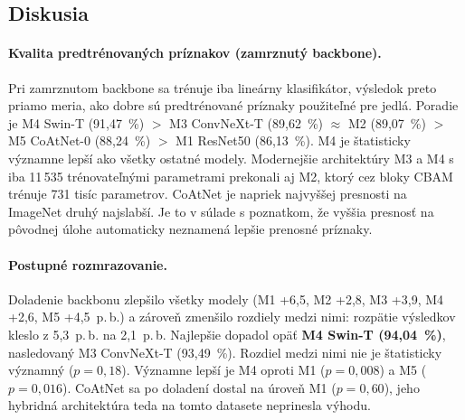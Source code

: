 
\subsection{Diskusia}

\paragraph{Kvalita predtrénovaných príznakov (zamrznutý backbone).}
Pri zamrznutom backbone sa trénuje iba lineárny klasifikátor, výsledok
preto priamo meria, ako dobre sú predtrénované príznaky použiteľné pre
jedlá. Poradie je M4 Swin-T (91,47~\%) $>$ M3 ConvNeXt-T (89,62~\%)
$\approx$ M2 (89,07~\%) $>$ M5 CoAtNet-0 (88,24~\%) $>$ M1 ResNet50
(86,13~\%). M4 je štatisticky významne lepší ako všetky ostatné modely.
Modernejšie architektúry M3 a M4 s iba 11\,535 trénovateľnými parametrami
prekonali aj M2, ktorý cez bloky CBAM trénuje 731 tisíc parametrov. CoAtNet
je napriek najvyššej presnosti na ImageNet druhý najslabší. Je to v súlade
s poznatkom, že vyššia presnosť na pôvodnej úlohe automaticky neznamená
lepšie prenosné príznaky.

\paragraph{Postupné rozmrazovanie.} Doladenie backbonu zlepšilo všetky
modely (M1 +6,5, M2 +2,8, M3 +3,9, M4 +2,6, M5 +4,5~p.\,b.) a zároveň
zmenšilo rozdiely medzi nimi: rozpätie výsledkov kleslo z 5,3~p.\,b. na
2,1~p.\,b. Najlepšie dopadol opäť \textbf{M4 Swin-T (94,04~\%)}, nasledovaný
M3 ConvNeXt-T (93,49~\%). Rozdiel medzi nimi nie je štatisticky významný
($p = 0{,}18$). Významne lepší je M4 oproti M1 ($p = 0{,}008$) a M5
($p = 0{,}016$). CoAtNet sa po doladení dostal na úroveň M1 ($p = 0{,}60$),
jeho hybridná architektúra teda na tomto datasete neprinesla výhodu.


